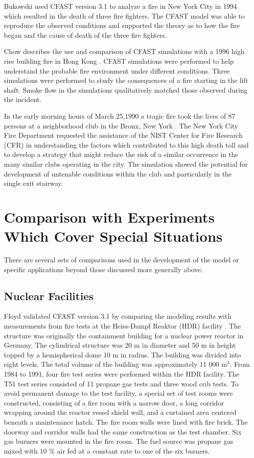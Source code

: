 Bukowski used CFAST version 3.1 to analyze a fire in New York City \cite{Bukowski:1996} in 1994 which resulted in the death of three fire fighters. The CFAST model was able to reproduce the observed conditions and supported the theory as to how the fire began and the cause of death of the three fire fighters.

Chow describes the use and comparison of CFAST simulations with a 1996 high rise building fire in Hong Kong \cite{Chow:1996}. CFAST simulations were performed to help understand the probable fire environment under different conditions. Three simulations were performed to study the consequences of a fire starting in the lift shaft. Smoke flow in the simulations qualitatively matched those observed during the incident.

In the early morning hours of March 25,1990 a tragic fire took the lives of 87 persons at a neighborhood club in the Bronx, New York \cite{Bukowski:1992}. The New York City Fire Department requested the assistance of the NIST Center for Fire Research (CFR) in understanding the factors which contributed to this high death toll and to develop a strategy that might reduce the risk of a similar occurrence in the many similar clubs operating in the city. The simulation showed the potential for development of untenable conditions within the club and particularly in the single exit stairway.

\section{Comparison with Experiments Which Cover Special Situations}

There are several sets of comparisons used in the development of the model or specific applications beyond those discussed more generally above.

\subsection{Nuclear Facilities}

Floyd validated CFAST version 3.1 by comparing the modeling results with measurements from fire tests at the Heiss-Dampf Reaktor (HDR) facility \cite{Floyd:2002}. The structure was originally the containment building for a nuclear power reactor in Germany. The cylindrical structure was 20 m in diameter and 50 m in height topped by a hemispherical dome 10 m in radius. The building was divided into eight levels. The total volume of the building was approximately 11 000 m$^3$. From 1984 to
1991, four fire test series were performed within the HDR facility. The T51 test series consisted of 11 propane gas tests and three wood crib tests. To avoid permanent damage to the test facility, a special set of test rooms were constructed, consisting of a fire room with a narrow door, a long corridor wrapping around the reactor vessel shield wall, and a curtained area centered beneath a maintenance hatch. The fire room walls were lined with fire brick. The doorway and corridor walls had the same construction as the test chamber. Six gas burners were mounted in the fire room. The fuel source was propane gas mixed with 10 \% air fed at a constant rate to one of the six burners.

